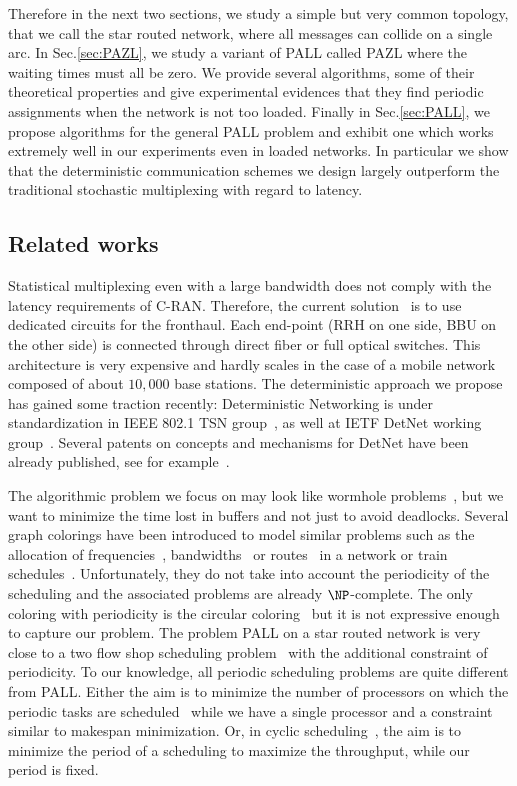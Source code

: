 \documentclass[10pt, conference, letterpaper]{IEEEtran}
\begin{document}
Therefore in the next two sections, we study a simple but very common topology, that we call the
star routed network, where all messages can collide on a single arc.
In Sec.\ref{sec:PAZL}, we study a variant of PALL called PAZL  where the waiting times must all be zero. We provide several algorithms, some of their theoretical properties and give experimental evidences that they find periodic assignments when the network is not too loaded. Finally in Sec.\ref{sec:PALL}, we propose algorithms for the general PALL problem and exhibit one which works extremely well in our experiments even in loaded networks. In particular we show that the deterministic communication schemes we design largely outperform the traditional stochastic multiplexing with regard to latency. 
 \subsection*{Related works}

 Statistical multiplexing even with a large bandwidth does not comply with the latency requirements of C-RAN. Therefore, the current solution~\cite{pizzinat2015things,tayq2017real} is to use dedicated circuits for the fronthaul. Each end-point (RRH on one side, BBU on the other side) is connected through direct fiber or full optical switches. This architecture is very expensive and hardly scales in the case of a mobile network composed of about $10,000$ base stations. The deterministic approach we propose has gained some traction recently: Deterministic Networking is under standardization in IEEE 802.1 TSN group~\cite{finn-detnet-architecture-08}, as well at IETF DetNet working group~\cite{ieee802}. Several patents on concepts and mechanisms for DetNet have been already published, see for example~\cite{howe2005time,leclerc2016transmission}. 
     
The algorithmic problem we focus on may look like wormhole problems~\cite{cole1996benefit}, but we want to minimize the time lost in buffers and not just to avoid deadlocks. Several graph colorings have been introduced to model similar problems such as the allocation of frequencies~\cite{borndorfer1998frequency}, bandwidths~\cite{erlebach2001complexity} or routes~\cite{cole1996benefit} in a network or train schedules~\cite{strotmann2007railway}. Unfortunately, they do not take into account the periodicity of the scheduling and the associated problems are already $\NP$-complete. The only coloring with periodicity is the circular coloring~\cite{zhou2013multiple} but it is not expressive enough to capture our problem. 
The problem PALL on a star routed network is very close to a two flow shop scheduling problem~\cite{yu2004minimizing}
with the additional constraint of periodicity. To our knowledge, all periodic scheduling problems are quite different from PALL.
Either the aim is to minimize the number of processors on which the periodic tasks are scheduled~\cite{korst1991periodic,hanen1993cyclic} while we have a single processor and a constraint similar to makespan minimization. Or, in cyclic scheduling~\cite{levner2010complexity}, the aim is to minimize the period of a scheduling to maximize the throughput, while our period is fixed. 
\end{document}

